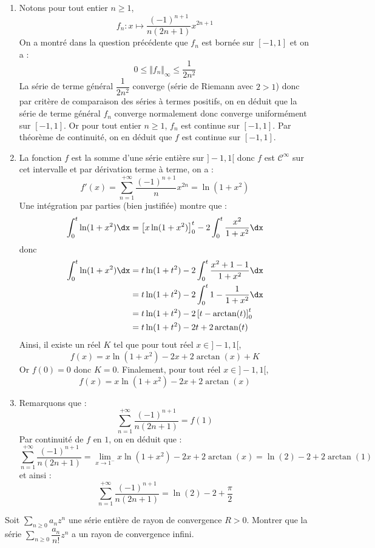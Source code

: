 \documentclass[a4paper,10pt]{report}
\newcommand{\Sum}[2]{\ensuremath{\textstyle{\sum\limits_{#1}^{#2}}}}
\begin{document}
\begin{enumerate}
\item Notons pour tout entier $n \geq 1$,
$$ f_n : x \mapsto \dfrac{(-1)^{n+1}}{n(2n+1)} x^{2n+1}$$
On a montré dans la question précédente que $f_n$ est bornée sur $[-1,1]$ et on a :
$$ 0 \leq \Vert f_n \Vert_{\infty} \leq  \dfrac{1}{2n^2}$$
La série de terme général $\dfrac{1}{2n^2}$ converge (série de Riemann avec $2>1$) donc par critère de comparaison des séries à termes positifs, on en déduit que la série de terme général $f_n$ converge normalement donc converge uniformément sur $[-1,1]$. Or pour tout entier $n \geq 1$, $f_n$ est continue sur $[-1,1]$. Par théorème de continuité, on en déduit que $f$ est continue sur $[-1,1]$.
\item La fonction $f$ est la somme d'une série entière sur $]-1,1[$ donc $f$ est $\mathcal{C}^{\infty}$ sur cet intervalle et par dérivation terme à terme, on a :
$$ f'(x) = \sum_{n=1}^{+ \infty}  \dfrac{(-1)^{n+1}}{n} x^{2n} = \ln(1+x^2)$$
Une intégration par parties (bien justifiée) montre que :
$$ \int_0^{t} \ln(1+x^2) \dx = \left[ x \ln(1+x^2) \right]_0^t - 2\int_0^t \dfrac{x^2}{1+x^2} \dx$$
donc 
\begin{align*}
 \int_0^{t} \ln(1+x^2) \dx & =  t \ln(1+t^2)  - 2\int_0^t \dfrac{x^2+1-1}{1+x^2} \dx \\
 & = t \ln(1+t^2)  - 2\int_0^t 1 - \dfrac{1}{1+x^2} \dx \\
 & = t \ln(1+t^2) - 2 \left[ t - \arctan(t) \right]_0^t \\
 & = t \ln(1+t^2) - 2t + 2 \arctan(t)
\end{align*}
Ainsi, il existe un réel $K$ tel que pour tout réel $x \in ]-1,1[$,
$$ f(x) = x \ln(1+x^2) - 2x + 2 \arctan(x) + K$$
Or $f(0)=0$ donc $K=0$. Finalement, pour tout réel $x \in ]-1,1[$,
$$ f(x) = x \ln(1+x^2) - 2x + 2 \arctan(x) $$
\item Remarquons que :
$$ \sum_{n=1}^{+ \infty} \dfrac{(-1)^{n+1}}{n(2n+1)}  = f(1)$$
Par continuité de $f$ en $1$, on en déduit que :
$$ \sum_{n=1}^{+ \infty} \dfrac{(-1)^{n+1}}{n(2n+1)} = \lim_{x \rightarrow 1^{-}}  x \ln(1+x^2) - 2x + 2 \arctan(x) =\ln(2)-2+ 2 \arctan(1)$$
et ainsi :
$$ \sum_{n=1}^{+ \infty} \dfrac{(-1)^{n+1}}{n(2n+1)} = \ln(2)-2 + \dfrac{\pi}{2}$$
\end{enumerate}

\begin{Exercice}{} Soit $\Sum{n \geq 0}{} a_n z^n$ une série entière de rayon de convergence $R>0$. Montrer que  la série $\Sum{n \geq 0}{} \dfrac{a_n}{n!}z^n$ a un rayon de convergence infini. 
\end{Exercice}
\end{document}

